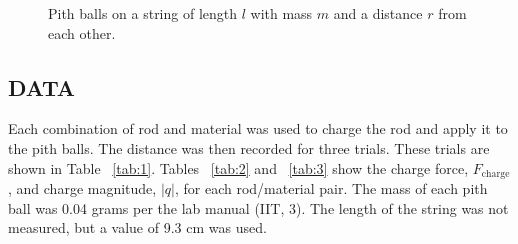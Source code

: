 \documentclass [12pt, letterpaper, twoside] {article}
\begin{document}
\begin{figure}
  \begin{center}
    \caption{Pith balls on a string of length \(l\) with mass \(m\) and a distance \(r\) from each other.}
    \label{fig:1}
  \end{center}
\end{figure}

\subsection* {DATA}
Each combination of rod and material was used to charge the rod and apply it to the pith balls. The distance was then recorded for three trials. These trials are shown in Table ~\ref{tab:1}. Tables ~\ref{tab:2} and ~\ref{tab:3} show the charge force, \(F_{\text{charge}}\), and charge magnitude, \(|q|\), for each rod/material pair. The mass of each pith ball was 0.04 grams per the lab manual (IIT, 3). The length of the string was not measured, but a value of 9.3 cm was used.
\end{document}

